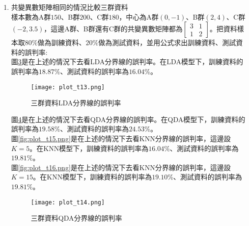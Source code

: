 \documentclass[12pt, a4paper]{article}
\begin{document}
\begin{enumerate}
圖\;\ref{fig:plot_t8.png}\;是在上述的情況下去看\;KNN\;分界線的誤判率，在這邊設\;$K=5$\;。在KNN模型下，訓練資料的誤判率為\;$10.21\%$\;、測試資料的誤判率為\;$15.83\%$\;。\\
圖\;\ref{fig:plot_t9.png}\;是在上述的情況下去看\;KNN\;分界線的誤判率，這邊設\;$K=15$\;。在KNN模型下，訓練資料的誤判率為\;$11.67\%$\;、測試資料的誤判率為\;$18.33\%$\;。\\
因此，透過測試資料的錯判率比較，得出在共變異數矩陣不相同的情況比較兩群資料時，使用QDA模型是最好的。
\begin{figure}[H]
\centering
\texttt{[image: plot\_t8.png]}
\caption{兩群資料KNN分界線的誤判率}
\label{fig:plot_t8.png}
\end{figure}

\begin{figure}[H]
\centering
\texttt{[image: plot\_t9.png]}
\caption{兩群資料KNN分界線的誤判率}
\label{fig:plot_t9.png}
\end{figure}





\item 共變異數矩陣相同的情況比較三群資料\\
樣本數為A群\;$150$\;、B群\;$200$\;、C群\;$180$\;，中心為A群\;$(0, -1)$\;、B群\;$(2,4)$\;、C群\;$(-2,3.5)$\;，這邊A群、B群還有C群的共變異數矩陣都為\;$\begin{bmatrix}3 & 1 \\1 & 2 \end{bmatrix}$\;。把資料樣本取\;$80\%$\;做為訓練資料、\;$20\%$\;做為測試資料，並用公式求出訓練資料、測試資料的誤判率\;:\\
圖\;\ref{fig:plot_t13.png}\;是在上述的情況下去看\;LDA\;分界線的誤判率。在LDA模型下，訓練資料的誤判率為\;$18.87\%$\;、測試資料的誤判率為\;$16.04\%$\;。

\begin{figure}[h]
\centering
 \texttt{[image: plot\_t13.png]}
\caption{三群資料LDA分界線的誤判率}
\label{fig:plot_t13.png}
\end{figure}

圖\;\ref{fig:plot_t14.png}\;是在上述的情況下去看\;QDA\;分界線的誤判率。在QDA模型下，訓練資料的誤判率為\;$19.58\%$\;、測試資料的誤判率為\;$24.53\%$\;。\\
圖\;\ref{fig:plot_t15.png}\;是在上述的情況下去看\;KNN\;分界線的誤判率，這邊設\;$K=5$\;。在KNN模型下，訓練資料的誤判率為\;$16.04\%$\;、測試資料的誤判率為\;$19.81\%$\;。\\
圖\;\ref{fig:plot_t16.png}\;是在上述的情況下去看\;KNN\;分界線的誤判率，這邊設\;$K=15$\;。在KNN模型下，訓練資料的誤判率為\;$19.10\%$\;、測試資料的誤判率為\;$19.81\%$\;。
\begin{figure}[H]
\centering
\texttt{[image: plot\_t14.png]}
\caption{三群資料QDA分界線的誤判率}
\label{fig:plot_t14.png}
\end{figure}



\end{enumerate}
\end{document}
